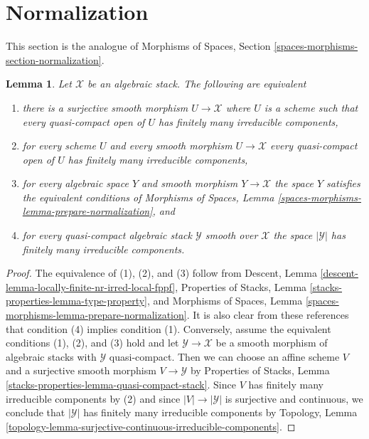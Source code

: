 \documentclass{stacks-project}
\theoremstyle{plain}
\newtheorem{lemma}[subsection]{Lemma}
\theoremstyle{definition}
\theoremstyle{remark}
\numberwithin{equation}{subsection}
\begin{document}
\section{Normalization}
\label{section-normalization}

\noindent
This section is the analogue of
Morphisms of Spaces, Section \ref{spaces-morphisms-section-normalization}.

\begin{lemma}
\label{lemma-prepare-normalization}
Let $\mathcal{X}$ be an algebraic stack. The following are equivalent
\begin{enumerate}
\item there is a surjective smooth morphism $U \to \mathcal{X}$ where $U$
is a scheme such that every quasi-compact open of $U$ has
finitely many irreducible components,
\item for every scheme $U$ and every smooth morphism
$U \to \mathcal{X}$ every quasi-compact open of $U$ has finitely many
irreducible components,
\item for every algebraic space $Y$ and smooth morphism $Y \to \mathcal{X}$
the space $Y$ satisfies the equivalent conditions of
Morphisms of Spaces, Lemma \ref{spaces-morphisms-lemma-prepare-normalization},
and
\item for every quasi-compact algebraic stack $\mathcal{Y}$ smooth over
$\mathcal{X}$ the space $|\mathcal{Y}|$ has finitely many irreducible
components.
\end{enumerate}
\end{lemma}

\begin{proof}
The equivalence of (1), (2), and (3) follow from
Descent, Lemma \ref{descent-lemma-locally-finite-nr-irred-local-fppf},
Properties of Stacks, Lemma \ref{stacks-properties-lemma-type-property}, and
Morphisms of Spaces, Lemma \ref{spaces-morphisms-lemma-prepare-normalization}.
It is also clear from these references that condition (4)
implies condition (1). Conversely, assume the equivalent conditions
(1), (2), and (3) hold and let $\mathcal{Y} \to \mathcal{X}$ be a
smooth morphism of algebraic stacks with $\mathcal{Y}$
quasi-compact. Then we can choose an affine scheme $V$ and a surjective
smooth morphism $V \to \mathcal{Y}$ by Properties of Stacks, Lemma
\ref{stacks-properties-lemma-quasi-compact-stack}.
Since $V$ has finitely many irreducible components by (2) and since
$|V| \to |\mathcal{Y}|$ is surjective and continuous, we conclude that
$|\mathcal{Y}|$ has finitely many irreducible components by Topology, Lemma
\ref{topology-lemma-surjective-continuous-irreducible-components}.
\end{proof}
\end{document}
